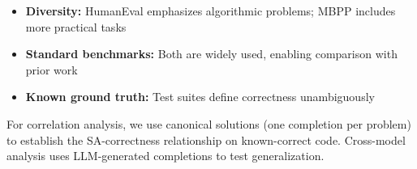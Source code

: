 \begin{itemize}
\item \textbf{Diversity:} HumanEval emphasizes algorithmic problems; MBPP includes more practical tasks
\item \textbf{Standard benchmarks:} Both are widely used, enabling comparison with prior work
\item \textbf{Known ground truth:} Test suites define correctness unambiguously
\end{itemize}

For correlation analysis, we use canonical solutions (one completion per problem) to establish the SA-correctness relationship on known-correct code. Cross-model analysis uses LLM-generated completions to test generalization.
